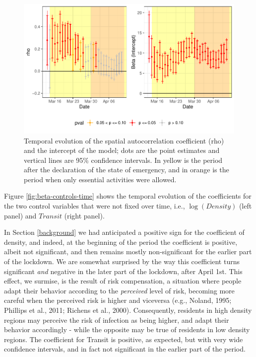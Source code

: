 \documentclass[]{elsarticle} %
\makeatletter
\def\maxwidth{\ifdim\Gin@nat@width>\linewidth\linewidth
\else\Gin@nat@width\fi}
\let\Oldincludegraphics\includegraphics
\renewcommand{\includegraphics}[1]{\Oldincludegraphics[width=\maxwidth]{#1}}
\makeatother
\begin{document}
\begin{figure}
\centering
\includegraphics{Environmental-Correlates-of-COVID19-Spain_files/figure-latex/results-time-1-1.pdf}
\caption{\label{fig:results-time-1}Temporal evolution of the spatial
autocorrelation coefficient (rho) and the intercept of the model; dots
are the point estimates and vertical lines are 95\% confidence
intervals. In yellow is the period after the declaration of the state of
emergency, and in orange is the period when only essential activities
were allowed.}
\end{figure}

Figure \ref{fig:beta-controls-time} shows the temporal evolution of the
coefficients for the two control variables that were not fixed over
time, i.e., \(\log(Density)\) (left panel) and \(Transit\) (right
panel).

In Section \ref{background} we had anticipated a positive sign for the
coefficient of density, and indeed, at the beginning of the period the
coefficient is positive, albeit not significant, and then remains mostly
non-significant for the earlier part of the lockdown. We are somewhat
surprised by the way this coefficient turns significant \emph{and}
negative in the later part of the lockdown, after April 1st. This
effect, we surmise, is the result of risk compensation, a situation
where people adapt their behavior according to the \emph{perceived}
level of risk, becoming more careful when the perceived risk is higher
and viceversa (e.g., Noland, 1995; Phillips et al., 2011; Richens et
al., 2000). Consequently, residents in high density regions may perceive
the risk of infection as being higher, and adapt their behavior
accordingly - while the opposite may be true of residents in low density
regions. The coefficient for Transit is positive, as expected, but with
very wide confidence intervals, and in fact not significant in the
earlier part of the period.
\end{document}
